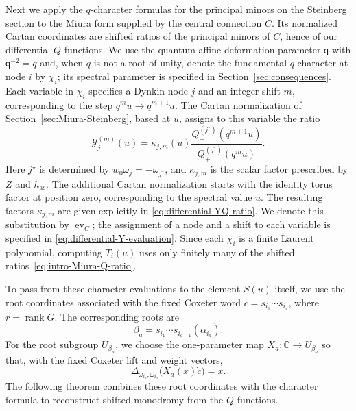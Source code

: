 \documentclass[11pt,leqno]{amsart}
\numberwithin{equation}{section}
\theoremstyle{plain}
\theoremstyle{definition}
\theoremstyle{plain}
\theoremstyle{definition}
\theoremstyle{remark}
\newcommand{\qaff}{\mathsf q}
\begin{document}
Next we apply the $q$-character formulas for the principal minors on the Steinberg section to the Miura form supplied by the central connection $C$.  Its normalized Cartan coordinates are shifted ratios of the principal minors of $C$, hence of our differential $Q$-functions.  We use the quantum-affine deformation parameter $\qaff$ with $\qaff^{-2}=q$ and, when $q$ is not a root of unity, denote the fundamental $q$-character at node $i$ by $\chi_i$; its spectral parameter is specified in Section~\ref{sec:consequences}.  Each variable in $\chi_i$ specifies a Dynkin node $j$ and an integer shift $m$, corresponding to the step $q^mu\to q^{m+1}u$.  The Cartan normalization of Section~\ref{sec:Miura-Steinberg}, based at $u$, assigns to this variable the ratio
\begin{equation}\label{eq:intro-Miura-Q-ratio}
 \mathcal Y_j^{(m)}(u)
 =\kappa_{j,m}(u)
   \frac{Q_+^{(j^\star)}(q^{m+1}u)}{Q_+^{(j^\star)}(q^mu)}.
\end{equation}
Here $j^\star$ is determined by $w_0\omega_j=-\omega_{j^\star}$, and $\kappa_{j,m}$ is the scalar factor prescribed by $Z$ and $h_{\mathrm{as}}$.  The additional Cartan normalization starts with the identity torus factor at position zero, corresponding to the spectral value $u$.  The resulting factors $\kappa_{j,m}$ are given explicitly in \eqref{eq:differential-YQ-ratio}.  We denote this substitution by $\operatorname{ev}_C$; the assignment of a node and a shift to each variable is specified in \eqref{eq:differential-Y-evaluation}.  Since each $\chi_i$ is a finite Laurent polynomial, computing $T_i(u)$ uses only finitely many of the shifted ratios~\eqref{eq:intro-Miura-Q-ratio}.

To pass from these character evaluations to the element $S(u)$ itself, we use the root coordinates associated with the fixed Coxeter word $c=s_{i_1}\cdots s_{i_r}$, where $r=\operatorname{rank}G$.  The corresponding roots are
\[
 \beta_a=s_{i_1}\cdots s_{i_{a-1}}(\alpha_{i_a}).
\]
For the root subgroup $U_{\beta_a}$, we choose the one-parameter map $X_a:\mathbb C\to U_{\beta_a}$ so that, with the fixed Coxeter lift and weight vectors,
\[
 \Delta_{\omega_{i_a},\omega_{i_a}}\bigl(X_a(x)\dot c\bigr)=x.
\]
The following theorem combines these root coordinates with the character formula to reconstruct shifted monodromy from the $Q$-functions.
\end{document}
